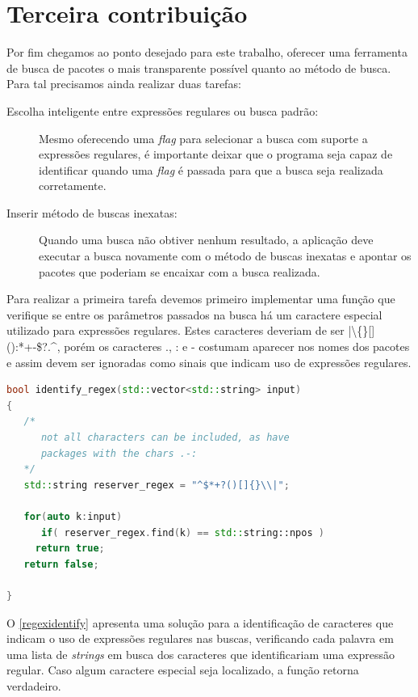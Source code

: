 
\section{Terceira contribuição} %
\label{sec:terceira_contribui_o}

Por fim chegamos ao ponto desejado para este trabalho, oferecer uma ferramenta de busca de pacotes o mais transparente possível quanto ao método de busca. Para tal precisamos ainda realizar duas tarefas:

\begin{description}
	\item [Escolha inteligente entre expressões regulares ou busca padrão:] Mesmo oferecendo uma \textit{flag} para selecionar a busca com suporte a expressões regulares, é importante deixar que o programa seja capaz de identificar quando uma \textit{flag} é passada para que a busca seja realizada corretamente.
	\item [Inserir método de buscas inexatas:] Quando uma busca não obtiver nenhum resultado, a aplicação deve executar a busca novamente com o método de buscas inexatas e apontar os pacotes que poderiam se encaixar com a busca realizada.
\end{description}

Para realizar a primeira tarefa devemos primeiro implementar uma função que verifique se entre os parâmetros passados na busca há um caractere especial utilizado para expressões regulares. Estes caracteres deveriam de ser {\code |\textbackslash\{\}[]():*+-\$?.\^{}}, porém os caracteres {\code .}, {\code :} e {\code -} costumam aparecer nos nomes dos pacotes e assim devem ser ignoradas como sinais que indicam uso de expressões regulares.

\begin{lstlisting}[language=C++,label=regexidentify,caption={Identificação de Expressões Regulares}]
bool identify_regex(std::vector<std::string> input)
{
   /*
      not all characters can be included, as have
      packages with the chars .-:
   */
   std::string reserver_regex = "^$*+?()[]{}\\|";

   for(auto k:input)
      if( reserver_regex.find(k) == std::string::npos )
	 return true;
   return false;

}
\end{lstlisting}

O \autoref{regexidentify} apresenta uma solução para a identificação de caracteres que indicam o uso de expressões regulares nas buscas, verificando cada palavra em uma lista de \textit{strings} em busca dos caracteres que identificariam uma expressão regular. Caso algum caractere especial seja localizado, a função retorna verdadeiro.


